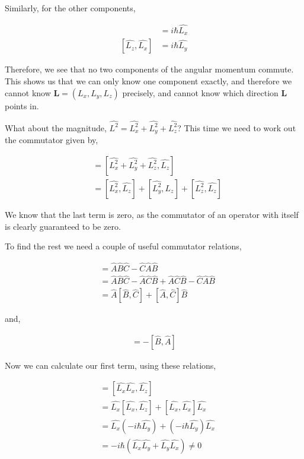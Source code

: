 \documentclass[11pt]{amsart}
\begin{document}
Similarly, for the other components,

\begin{align*}
  [\hat{L_y}, \hat{L_z}] &= i\hbar\hat{L_x} \\
  [\hat{L_z}, \hat{L_x}] &= i\hbar\hat{L_y}
\end{align*}

Therefore, we see that no two components of the angular momentum commute. This shows us that we can only know one component exactly, and therefore we cannot know $\mathbf{L} = (L_x, L_y, L_z)$ precisely, and cannot know which direction $\mathbf{L}$ points in.

What about the magnitude, $\hat{L^2} = \hat{L_x^2} + \hat{L_y^2} + \hat{L_z^2}$? This time we need to work out the commutator given by,

\begin{align*}
  [\hat{L^2}, \hat{L_z}] &= [\hat{L_x^2} + \hat{L_y^2} + \hat{L_z^2}, \hat{L_z}] \\
                         &= [\hat{L_x^2}, \hat{L_z}] + [\hat{L_y^2}, \hat{L_z}] + [\hat{L_z^2}, \hat{L_z}]
\end{align*}

We know that the last term is zero, as the commutator of an operator with itself is clearly guaranteed to be zero.

To find the rest we need a couple of useful commutator relations,

\begin{align*}
  [\hat{A}\hat{B}, \hat{C}] &= \hat{A}\hat{B}\hat{C}-\hat{C}\hat{A}\hat{B} \\
                            &= \hat{A}\hat{B}\hat{C}-\hat{A}\hat{C}\hat{B}+\hat{A}\hat{C}\hat{B}-\hat{C}\hat{A}\hat{B} \\
                            &= \hat{A}[\hat{B},\hat{C}]+[\hat{A},\hat{C}]\hat{B}
\end{align*}

and,

\begin{align*}
  [\hat{A},\hat{B}]=-[\hat{B},\hat{A}]
\end{align*}

Now we can calculate our first term, using these relations,

\begin{align*}
  [\hat{L_x^2}, \hat{L_z}] &= [\hat{L_x}\hat{L_x}, \hat{L_z}] \\
                           &= \hat{L_x}[\hat{L_x}, \hat{L_z}] + [\hat{L_x}, \hat{L_x}]\hat{L_x} \\
                           &= \hat{L_x}(-i\hbar\hat{L_y}) + (-i\hbar\hat{L_y})\hat{L_x} \\
                           &= -i\hbar(\hat{L_x}\hat{L_y} + \hat{L_y}\hat{L_x}) \neq 0
\end{align*}
\end{document}
